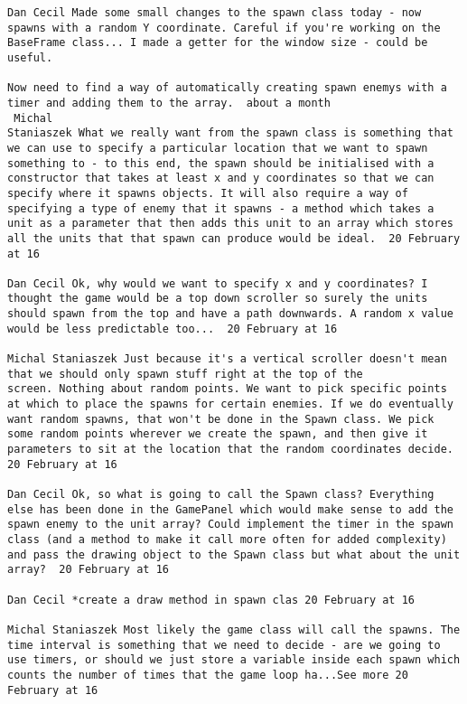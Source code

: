 \begin{verbatim}
Dan Cecil Made some small changes to the spawn class today - now
spawns with a random Y coordinate. Careful if you're working on the
BaseFrame class... I made a getter for the window size - could be
useful.

Now need to find a way of automatically creating spawn enemys with a
timer and adding them to the array.  about a month 
 Michal
Staniaszek What we really want from the spawn class is something that
we can use to specify a particular location that we want to spawn
something to - to this end, the spawn should be initialised with a
constructor that takes at least x and y coordinates so that we can
specify where it spawns objects. It will also require a way of
specifying a type of enemy that it spawns - a method which takes a
unit as a parameter that then adds this unit to an array which stores
all the units that that spawn can produce would be ideal.  20 February
at 16

Dan Cecil Ok, why would we want to specify x and y coordinates? I
thought the game would be a top down scroller so surely the units
should spawn from the top and have a path downwards. A random x value
would be less predictable too...  20 February at 16

Michal Staniaszek Just because it's a vertical scroller doesn't mean
that we should only spawn stuff right at the top of the
screen. Nothing about random points. We want to pick specific points
at which to place the spawns for certain enemies. If we do eventually
want random spawns, that won't be done in the Spawn class. We pick
some random points wherever we create the spawn, and then give it
parameters to sit at the location that the random coordinates decide.
20 February at 16

Dan Cecil Ok, so what is going to call the Spawn class? Everything
else has been done in the GamePanel which would make sense to add the
spawn enemy to the unit array? Could implement the timer in the spawn
class (and a method to make it call more often for added complexity)
and pass the drawing object to the Spawn class but what about the unit
array?  20 February at 16

Dan Cecil ‎*create a draw method in spawn clas 20 February at 16

Michal Staniaszek Most likely the game class will call the spawns. The
time interval is something that we need to decide - are we going to
use timers, or should we just store a variable inside each spawn which
counts the number of times that the game loop ha...See more 20
February at 16


\end{verbatim}
